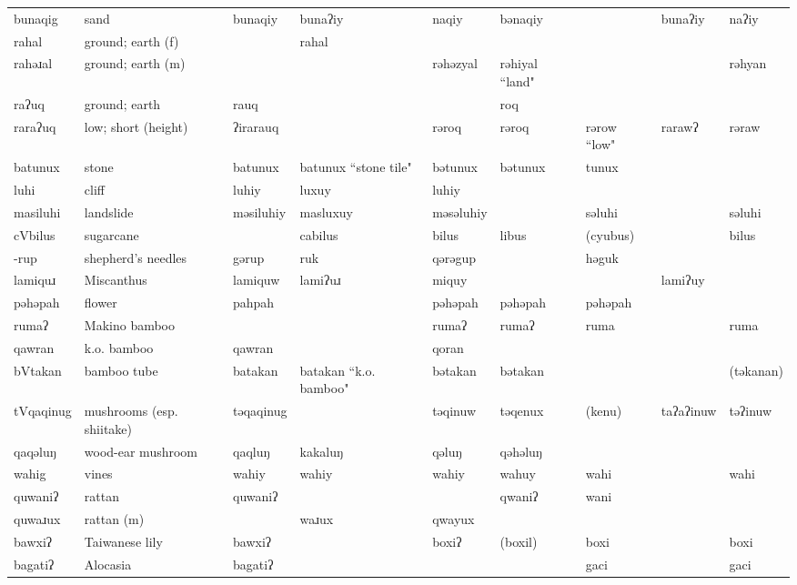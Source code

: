 \begin{landscape}
\begin{longtable}{*{9}{p{}}}
\text{*}bunaqig & sand & bunaqiy & bunaʔiy & naqiy & bənaqiy &  & bunaʔiy & naʔiy\\
\text{*}rahal & ground; earth (f) &  & rahal &  &  &  &  & \\
\text{*}rahəɹal & ground; earth (m) &  &  & rəhəzyal & rəhiyal ``land" &  &  & rəhyan\\
\text{*}raʔuq & ground; earth & rauq &  &  & roq &  &  & \\
\text{*}raraʔuq & low; short (height) & ʔirarauq &  & rəroq & rəroq & rərow ``low" & rarawʔ & rəraw\\
\text{*}batunux & stone & batunux & batunux ``stone tile" & bətunux & bətunux & tunux &  & \\
\text{*}luhi & cliff & luhiy & luxuy & luhiy &  &  &  & \\
\text{*}masiluhi & landslide & məsiluhiy & masluxuy & məsəluhiy &  & səluhi &  & səluhi\\
\text{*}cVbilus & sugarcane &  & cabilus & bilus & libus & (cyubus) &  & bilus\\
\text{*}-rup & shepherd's needles & gərup & ruk & qərəgup &  & həguk &  & \\
\text{*}lamiquɹ & Miscanthus & lamiquw & lamiʔuɹ & miquy &  &  & lamiʔuy & \\
\text{*}pəhəpah & flower & pahpah &  & pəhəpah & pəhəpah & pəhəpah &  & \\
\text{*}rumaʔ & Makino bamboo &  &  & rumaʔ & rumaʔ & ruma &  & ruma\\
\text{*}qawran & k.o. bamboo & qawran &  & qoran &  &  &  & \\
\text{*}bVtakan & bamboo tube & batakan & batakan ``k.o. bamboo" & bətakan & bətakan &  &  & (təkanan)\\
\text{*}tVqaqinug & mushrooms (esp. shiitake) & təqaqinug &  & təqinuw & təqenux & (kenu) & taʔaʔinuw & təʔinuw\\
\text{*}qaqəluŋ & wood-ear mushroom & qaqluŋ & kakaluŋ & qəluŋ & qəhəluŋ &  &  & \\
\text{*}wahig & vines & wahiy & wahiy & wahiy & wahuy & wahi &  & wahi\\
\text{*}quwaniʔ & rattan & quwaniʔ &  &  & qwaniʔ & wani &  & \\
\text{*}quwaɹux & rattan (m) &  & waɹux & qwayux &  &  &  & \\
\text{*}bawxiʔ & Taiwanese lily & bawxiʔ &  & boxiʔ & (boxil) & boxi &  & boxi\\
\text{*}bagatiʔ & Alocasia & bagatiʔ &  &  &  & gaci &  & gaci\\

\end{longtable}
\end{landscape}
